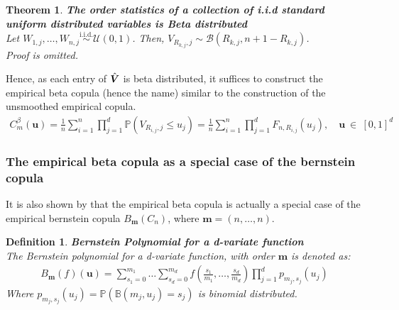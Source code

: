 \documentclass[12pt]{report}
\newtheorem{theorem}{Theorem}[subsection]
\newtheorem{definition}{Definition}[subsection]
\newcommand{\1}{\mathbf{1}}
\begin{document}
\begin{theorem}\label{OrderStatisticsBeta}
\textbf{The order statistics of a collection of i.i.d standard uniform distributed variables is Beta distributed} \\
Let $W_{1,j}, \dots, W_{n,j} \overset{\text{i.i.d.}}{\sim} \mathcal{U}(0,1)$. Then, $V_{R_{k,j},j} \sim \mathcal{B}(R_{k,j}, n + 1 - R_{k,j})$. \\
Proof is omitted.
\end{theorem}

Hence, as each entry of $\Hat{\boldsymbol{V}}$ is beta distributed, it suffices to construct the empirical beta copula (hence the name) similar to the construction of the unsmoothed empirical copula.
\begin{align*}
C^{\beta}_{m}(\boldsymbol{u}) = \frac{1}{n} \sum\limits_{i = 1}^{n} \prod\limits_{j = 1}^{d} \mathbb{P}(V_{R_{i,j},j} \le u_{j}) = \frac{1}{n} \sum\limits_{i = 1}^{n} \prod\limits_{j = 1}^{d} F_{n,R_{i,j}}(u_{j}), \quad \boldsymbol{u} \: \in \: [0,1]^{d}
\end{align*}

\subsubsection{The empirical beta copula as a special case of the bernstein copula}
\vspace{0.5cm}

It is also shown by \cite{SegersEBC} that the empirical beta copula is actually a special case of the empirical bernstein copula $B_{\boldsymbol{m}}(C_{n})$, where $\boldsymbol{m} = (n, \dots, n)$.

\begin{definition}\label{BernsteinPolynomial}
\textit{\normalfont\parencite{SegersEBC}}\:
\textbf{Bernstein Polynomial for a d-variate function} \\
The Bernstein polynomial for a d-variate function, with order $\boldsymbol{m}$ is denoted as:
\begin{align*}
B_{\boldsymbol{m}}(f)(\boldsymbol{u}) = \sum\limits_{s_{1} = 0}^{m_{1}} \dots \sum\limits_{s_{d} = 0}^{m_{d}} f \left(\frac{s_{1}}{m_{1}}, \dots, \frac{s_{d}}{m_{d}} \right) \prod\limits_{j = 1}^{d} p_{m_{j},s_{j}}(u_{j})
\end{align*}
Where $p_{m_{j},s_{j}}(u_{j}) = \mathbb{P}(\mathbb{B}(m_{j},u_{j}) = s_{j})$ is binomial distributed. \\ 
\end{definition}
\end{document}
